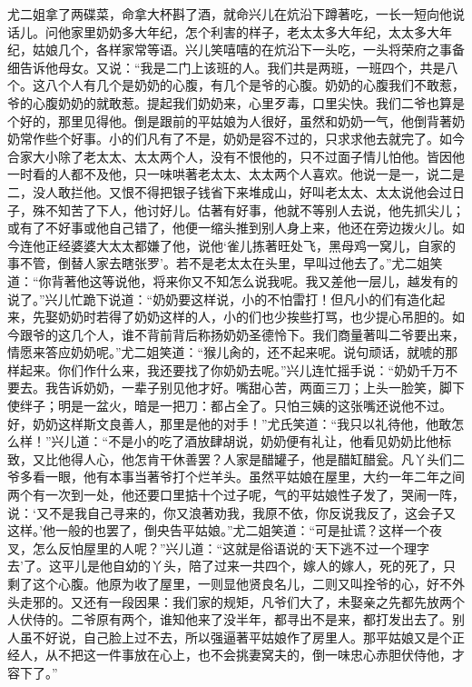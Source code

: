 \begin{parag}
    尤二姐拿了两碟菜，命拿大杯斟了酒，就命兴儿在炕沿下蹲著吃，一长一短向他说话儿。问他家里奶奶多大年纪，怎个利害的样子，老太太多大年纪，太太多大年纪，姑娘几个，各样家常等语。兴儿笑嘻嘻的在炕沿下一头吃，一头将荣府之事备细告诉他母女。又说：“我是二门上该班的人。我们共是两班，一班四个，共是八个。这八个人有几个是奶奶的心腹，有几个是爷的心腹。奶奶的心腹我们不敢惹，爷的心腹奶奶的就敢惹。提起我们奶奶来，心里歹毒，口里尖快。我们二爷也算是个好的，那里见得他。倒是跟前的平姑娘为人很好，虽然和奶奶一气，他倒背著奶奶常作些个好事。小的们凡有了不是，奶奶是容不过的，只求求他去就完了。如今合家大小除了老太太、太太两个人，没有不恨他的，只不过面子情儿怕他。皆因他一时看的人都不及他，只一味哄著老太太、太太两个人喜欢。他说一是一，说二是二，没人敢拦他。又恨不得把银子钱省下来堆成山，好叫老太太、太太说他会过日子，殊不知苦了下人，他讨好儿。估著有好事，他就不等别人去说，他先抓尖儿；或有了不好事或他自己错了，他便一缩头推到别人身上来，他还在旁边拨火儿。如今连他正经婆婆大太太都嫌了他，说他‘雀儿拣著旺处飞，黑母鸡一窝儿，自家的事不管，倒替人家去瞎张罗’。若不是老太太在头里，早叫过他去了。”尤二姐笑道：“你背著他这等说他，将来你又不知怎么说我呢。我又差他一层儿，越发有的说了。”兴儿忙跪下说道：“奶奶要这样说，小的不怕雷打！但凡小的们有造化起来，先娶奶奶时若得了奶奶这样的人，小的们也少挨些打骂，也少提心吊胆的。如今跟爷的这几个人，谁不背前背后称扬奶奶圣德怜下。我们商量著叫二爷要出来，情愿来答应奶奶呢。”尤二姐笑道：“猴儿肏的，还不起来呢。说句顽话，就唬的那样起来。你们作什么来，我还要找了你奶奶去呢。”兴儿连忙摇手说：“奶奶千万不要去。我告诉奶奶，一辈子别见他才好。嘴甜心苦，两面三刀；上头一脸笑，脚下使绊子；明是一盆火，暗是一把刀：都占全了。只怕三姨的这张嘴还说他不过。好，奶奶这样斯文良善人，那里是他的对手！”尤氏笑道：“我只以礼待他，他敢怎么样！”兴儿道：“不是小的吃了酒放肆胡说，奶奶便有礼让，他看见奶奶比他标致，又比他得人心，他怎肯干休善罢？人家是醋罐子，他是醋缸醋瓮。凡丫头们二爷多看一眼，他有本事当著爷打个烂羊头。虽然平姑娘在屋里，大约一年二年之间两个有一次到一处，他还要口里掂十个过子呢，气的平姑娘性子发了，哭闹一阵，说：‘又不是我自己寻来的，你又浪著劝我，我原不依，你反说我反了，这会子又这样。’他一般的也罢了，倒央告平姑娘。”尤二姐笑道：“可是扯谎？这样一个夜叉，怎么反怕屋里的人呢？”兴儿道：“这就是俗语说的‘天下逃不过一个理字去’了。这平儿是他自幼的丫头，陪了过来一共四个，嫁人的嫁人，死的死了，只剩了这个心腹。他原为收了屋里，一则显他贤良名儿，二则又叫拴爷的心，好不外头走邪的。又还有一段因果：我们家的规矩，凡爷们大了，未娶亲之先都先放两个人伏侍的。二爷原有两个，谁知他来了没半年，都寻出不是来，都打发出去了。别人虽不好说，自己脸上过不去，所以强逼著平姑娘作了房里人。那平姑娘又是个正经人，从不把这一件事放在心上，也不会挑妻窝夫的，倒一味忠心赤胆伏侍他，才容下了。”
\end{parag}


